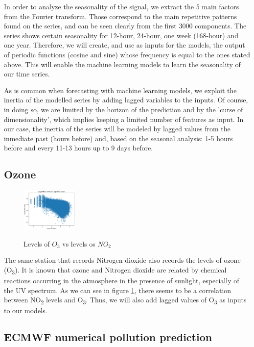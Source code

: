 \documentclass[a4paper,twocolumn,5p]{elsarticle}
\begin{document}
In order to analyze the seasonality of the signal, we extract the 5
main factors from the Fourier transform. Those correspond to the main
repetitive patterns found on the series, and can be seen clearly from
the first 3000 components. The series shows certain seasonality for
12-hour, 24-hour, one week (168-hour) and one year.  Therefore, we will
create, and use as inputs for the models, the output of periodic
functions (cosine and sine) whose frequency is equal to the ones
stated above. This will enable the machine learning models to learn
the seasonality of our time series.

As is common when forecasting with machine learning models, we exploit
the inertia of the modelled series by adding lagged variables to the
inputs. Of course, in doing so, we are limited by the horizon of the
prediction and by the 'curse of dimensionality', which implies keeping
a limited number of features as input. In our case, the inertia of the
series will be modeled by lagged values from the inmediate past (hours
before) and, based on the seasonal analysis: 1-5 hours before and
every 11-13 hours up to 9 days before.

\subsection{Ozone}

\begin{figure}
  \centering
  \includegraphics[width=0.25\textwidth]{no2vso3}
  \label{figure:no2vso3}
  \caption{Levels of $O_3$ vs levels os $NO_2$}
\end{figure}

The same station that records Nitrogen dioxide also records the levels
of ozone (O\textsubscript{3}). It is known that ozone and Nitrogen
dioxide are related by chemical reactions occurring in the atmosphere
in the presence of sunlight, especially of the UV spectrum.  As we can
see in figure \ref{figure:no2vso3}, there seems to be a correlation
between NO\textsubscript{2} levels and O\textsubscript{3}. Thus, we
will also add lagged values of O\textsubscript{3} as inputs to our
models.

\subsection{ECMWF numerical pollution prediction}
\label{sec:ecmwf-numer-poll}
\end{document}
